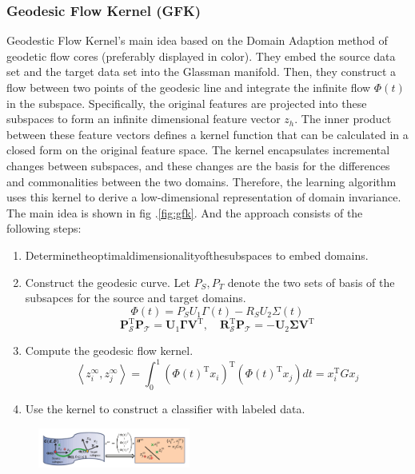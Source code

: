 \documentclass[conference]{IEEEtran}
\begin{document}
\subsubsection{Geodesic Flow Kernel (GFK)}
Geodestic Flow Kernel's\cite{gong2012geodesic} main idea based on the Domain Adaption method of geodetic flow cores (preferably displayed in color). They embed the source data set and the target data set into the Glassman manifold. Then, they construct a flow between two points of the geodesic line and integrate the infinite flow $\Phi(t)$ in the subspace. Specifically, the original features are projected into these subspaces to form an infinite dimensional feature vector $z_h$. The inner product between these feature vectors defines a kernel function that can be calculated in a closed form on the original feature space. The kernel encapsulates incremental changes between subspaces, and these changes are the basis for the differences and commonalities between the two domains. Therefore, the learning algorithm uses this kernel to derive a low-dimensional representation of domain invariance.
The main idea is shown in fig .\ref{fig:gfk}. And the approach consists of the following steps:
\begin{enumerate}
	\item Determinetheoptimaldimensionalityofthesubspaces to embed domains. 
	\item  Construct the geodesic curve. Let $P_S,P_T$ denote the two sets of basis of the subsapces for the source and target domains.
	\begin{equation}
	\Phi(t)=P_{S} U_{1} \Gamma(t)-R_{S} U_{2} \Sigma(t)
	\end{equation}
	\begin{equation}\boldsymbol{P}_{\mathcal{S}}^{\mathrm{T}} \boldsymbol{P}_{\mathcal{T}}=\boldsymbol{U}_{1} \boldsymbol{\Gamma} \boldsymbol{V}^{\mathrm{T}}, \quad \boldsymbol{R}_{\mathcal{S}}^{\mathrm{T}} \boldsymbol{P}_{\mathcal{T}}=-\boldsymbol{U}_{2} \boldsymbol{\Sigma} \boldsymbol{V}^{\mathrm{T}}
	\end{equation}
	\item Compute the geodesic ﬂow kernel.
	\begin{equation}\left\langle z_{i}^{\infty}, z_{j}^{\infty}\right\rangle=\int_{0}^{1}\left(\Phi(t)^{\mathrm{T}} x_{i}\right)^{\mathrm{T}}\left(\Phi(t)^{\mathrm{T}} x_{j}\right) d t=x_{i}^{\mathrm{T}} G x_{j}\end{equation}
	\item Use the kernel to construct a classiﬁer with labeled data. 
\end{enumerate}
\begin{center}
	\begin{figure}[htbp]
		\centering
		\includegraphics[width=5cm]{img/gfk.png}
		\caption{}
	\end{figure}\label{fig:gfk}
\end{center}
\end{document}
